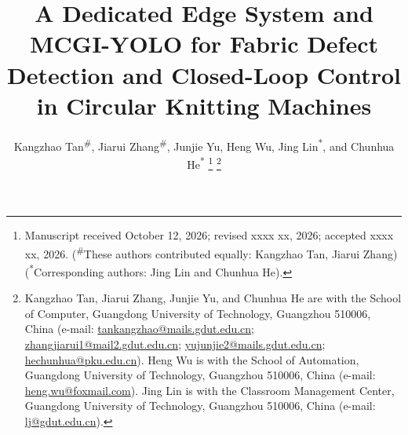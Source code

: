 \documentclass[journal]{IEEEtran}
\begin{document}
\raggedbottom

\title{A Dedicated Edge System and MCGI-YOLO for Fabric Defect Detection and Closed-Loop Control in Circular Knitting Machines}

\author{Kangzhao Tan\textsuperscript{\#}, Jiarui Zhang\textsuperscript{\#}, Junjie Yu, Heng Wu, Jing Lin\textsuperscript{*}, and Chunhua He\textsuperscript{*}%
\thanks{Manuscript received October 12, 2026; revised xxxx xx, 2026; accepted xxxx xx, 2026. (\textsuperscript{\#}These authors contributed equally: Kangzhao Tan, Jiarui Zhang) (\textsuperscript{*}Corresponding authors: Jing Lin and Chunhua He).}%
\thanks{\begingroup{}Kangzhao Tan, Jiarui Zhang, Junjie Yu, and Chunhua He are with the School of Computer, Guangdong University of Technology, Guangzhou 510006, China (e-mail: \protect\url{tankangzhao@mails.gdut.edu.cn}; \protect\url{zhangjiarui1@mail2.gdut.edu.cn}; \protect\url{yujunjie2@mails.gdut.edu.cn}; \protect\url{hechunhua@pku.edu.cn}). Heng Wu is with the School of Automation, Guangdong University of Technology, Guangzhou 510006, China (e-mail: \protect\url{heng.wu@foxmail.com}). Jing Lin is with the Classroom Management Center, Guangdong University of Technology, Guangzhou 510006, China (e-mail: \protect\url{lj@gdut.edu.cn}).\endgroup}%
}

\IEEEaftertitletext{\vspace{-24pt}}
\maketitle
\end{document}
